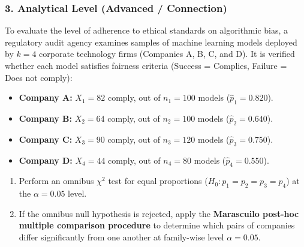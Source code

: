 \subsubsection*{3. Analytical Level (Advanced / Connection)}

\begin{problema}
	\label{prob:doc_k_proporciones_marascuilo}
	To evaluate the level of adherence to ethical standards on algorithmic bias, a regulatory audit agency examines samples of machine learning models deployed by $k = 4$ corporate technology firms (Companies A, B, C, and D). It is verified whether each model satisfies fairness criteria (Success = Complies, Failure = Does not comply):
	\begin{itemize}
		\item \textbf{Company A:} $X_1 = 82$ comply, out of $n_1 = 100$ models ($\hat{p}_1 = 0.820$).
		\item \textbf{Company B:} $X_2 = 64$ comply, out of $n_2 = 100$ models ($\hat{p}_2 = 0.640$).
		\item \textbf{Company C:} $X_3 = 90$ comply, out of $n_3 = 120$ models ($\hat{p}_3 = 0.750$).
		\item \textbf{Company D:} $X_4 = 44$ comply, out of $n_4 = 80$ models ($\hat{p}_4 = 0.550$).
	\end{itemize}
	\begin{enumerate}
		\item Perform an omnibus $\chi^2$ test for equal proportions ($H_0: p_1=p_2=p_3=p_4$) at the $\alpha = 0.05$ level.
		\item If the omnibus null hypothesis is rejected, apply the \textbf{Marascuilo post-hoc multiple comparison procedure} to determine which pairs of companies differ significantly from one another at family-wise level $\alpha = 0.05$.
	\end{enumerate}
\end{problema}

